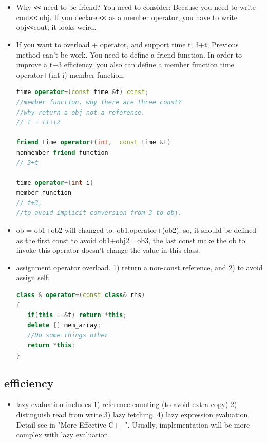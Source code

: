 \documentclass[a4paper,12pt,twoside]{book}
\begin{document}
\begin{itemize}

\item Why \verb=<<= need to be friend? You need to consider:  Because you need to write cout\verb=<<= obj. If you declare \verb=<<= as a member operator, you have to write obj\verb=<<=cout; it looks weird.

\item If you want to overload + operator, and support time t; 3+t;  Previous method can't be work. You need to define a friend function. In order to improve a t+3 efficiency, you also can define a member function time operator+(int i) member function.
\begin{lstlisting}[frame=single, language=c++]
time operator+(const time &t) const;
//member function. why there are three const?
//why return a obj not a reference.
// t = t1+t2

friend time operator+(int,  const time &t)
nonmember friend function
// 3+t

time operator+(int i)
member function
// t+3,
//to avoid implicit conversion from 3 to obj.
\end{lstlisting}
\item ob = ob1+ob2 will changed to:  ob1.operator+(ob2);  so,  it should be defined as
the first const to avoid ob1+obj2= ob3, the last const make the ob to invoke this operator doesn't change the value in this class.

\item assignment operator overload. 1) return a non-const reference, and 2) to avoid assign self.
\begin{lstlisting}[frame=single, language=c++]
class & operator=(const class& rhs)
{
   if(this ==&t) return *this;
   delete [] mem_array;
   //Do some things other
   return *this;
}
\end{lstlisting}

\end{itemize}


\subsection{efficiency}
\begin{itemize}
\item  lazy evaluation includes 1) reference counting (to avoid extra copy) 2) distinguish read from write 3) lazy fetching. 4) lazy expression evaluation. Detail see in "More Effective C++". Usually, implementation will be  more complex with lazy evaluation.

\end{itemize}
\end{document}
